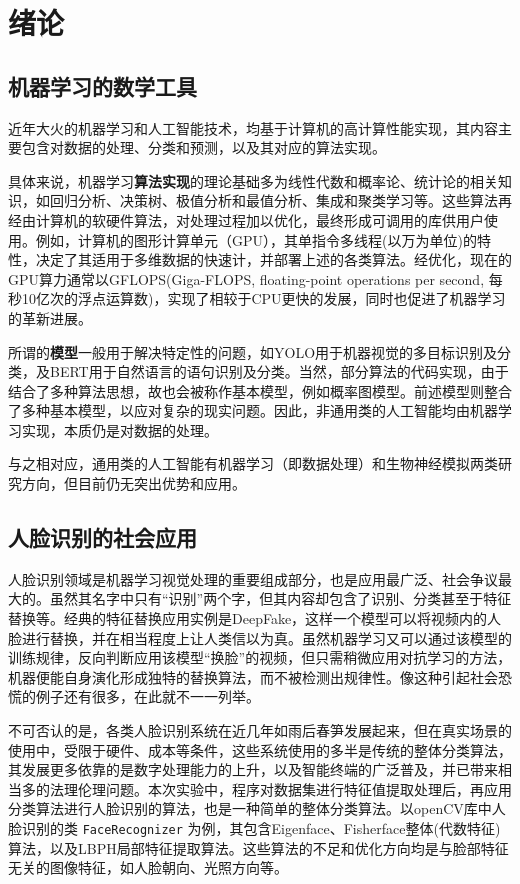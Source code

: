 
\chapter{绪论}

\section{机器学习的数学工具}
近年大火的机器学习和人工智能技术，均基于计算机的高计算性能实现，其内容主要包含对数据的处理、分类和预测，以及其对应的算法实现。

具体来说，机器学习\textbf{算法实现}的理论基础多为线性代数和概率论、统计论的相关知识，如回归分析、决策树、极值分析和最值分析、集成和聚类学习等。这些算法再经由计算机的软硬件算法，对处理过程加以优化，最终形成可调用的库供用户使用。例如，计算机的图形计算单元（GPU），其单指令多线程(以万为单位)的特性，决定了其适用于多维数据的快速计，并部署上述的各类算法。经优化，现在的GPU算力通常以GFLOPS(Giga-FLOPS, floating-point operations per second, 每秒10亿次的浮点运算数)，实现了相较于CPU更快的发展，同时也促进了机器学习的革新进展。

所谓的\textbf{模型}一般用于解决特定性的问题，如YOLO用于机器视觉的多目标识别及分类，及BERT用于自然语言的语句识别及分类。当然，部分算法的代码实现，由于结合了多种算法思想，故也会被称作基本模型，例如概率图模型。前述模型则整合了多种基本模型，以应对复杂的现实问题。因此，非通用类的人工智能均由机器学习实现，本质仍是对数据的处理。\cite{周志华_2016, Sulmont_2019}

与之相对应，通用类的人工智能有机器学习（即数据处理）和生物神经模拟两类研究方向，但目前仍无突出优势和应用。

\section{人脸识别的社会应用}

人脸识别领域是机器学习视觉处理的重要组成部分，也是应用最广泛、社会争议最大的。虽然其名字中只有“识别”两个字，但其内容却包含了识别、分类甚至于特征替换等。经典的特征替换应用实例是DeepFake，这样一个模型可以将视频内的人脸进行替换，并在相当程度上让人类信以为真。虽然机器学习又可以通过该模型的训练规律，反向判断应用该模型“换脸”的视频，但只需稍微应用对抗学习的方法，机器便能自身演化形成独特的替换算法，而不被检测出规律性。\cite{Guera_2018}像这种引起社会恐慌的例子还有很多，在此就不一一列举。

不可否认的是，各类人脸识别系统在近几年如雨后春笋发展起来，但在真实场景的使用中，受限于硬件、成本等条件，这些系统使用的多半是传统的整体分类算法，其发展更多依靠的是数字处理能力的上升，以及智能终端的广泛普及，并已带来相当多的法理伦理问题。本次实验中，程序对数据集进行特征值提取处理后，再应用分类算法进行人脸识别的算法，也是一种简单的整体分类算法。以openCV库中人脸识别的类 \verb|FaceRecognizer| 为例，其包含Eigenface、Fisherface整体(代数特征)算法，以及LBPH局部特征提取算法。这些算法的不足和优化方向均是与脸部特征无关的图像特征，如人脸朝向、光照方向等。

